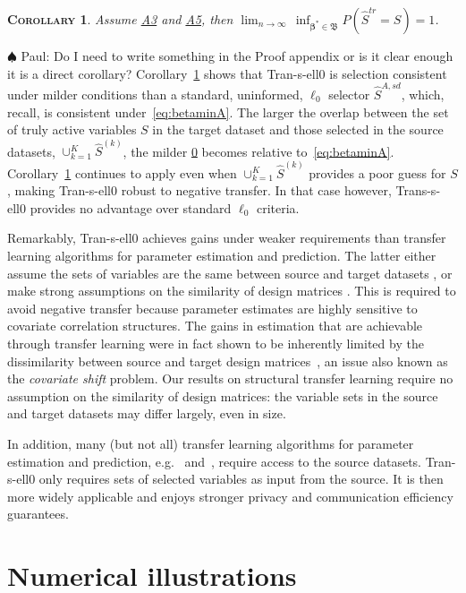 \documentclass[
  12pt]{article}
\newcommand{\paul}[1]{{\small{\color{green} \sf $\spadesuit$ Paul: #1}}}
\newcommand{\bbeta}{\boldsymbol{\beta}}
\newtheorem{cor}[thm]{\textsc{Corollary}}
\begin{document}
\begin{cor}\label{cor:TLconsist}
    Assume \hyperlink{lab:A3}{A3} and \hyperlink{lab:A5}{A5}, then $\lim_{n \to \infty} \,\inf_{\bbeta^*\in\mathfrak{B}}P(\hat{S}^{tr} = S) = 1$.
\end{cor}
\paul{Do I need to write something in the Proof appendix or is it clear enough it is a direct corollary?}
Corollary~\ref{cor:TLconsist} shows that Tran-s-ell0 is selection consistent under milder conditions than a standard, uninformed, $\ell_0$ selector $\hat S^{A,sd}$, which, recall, is consistent under~\eqref{eq:betaminA}. The larger the overlap between the set of truly active variables $S$ in the target dataset and those selected in the source datasets, $\cup_{k=1}^K\hat S^{(k)}$,
the milder \hyperlink{lab:A5}{0} becomes relative to~\eqref{eq:betaminA}.
Corollary~\ref{cor:TLconsist} continues to apply even when $\cup_{k=1}^K\hat S^{(k)}$ provides a poor guess for $S$, making Tran-s-ell0 robust to negative transfer. In that case however, Trans-s-ell0 provides no advantage over standard $\ell_0$ criteria.

Remarkably, Tran-s-ell0 achieves gains under weaker requirements than transfer learning algorithms for parameter estimation and prediction. The latter either assume the sets of variables are the same between source and target datasets \citep{abba2024}, or make strong assumptions on the similarity of design matrices \citep{Li2021,Tian2023}. This is required to avoid negative transfer because parameter estimates are highly sensitive to covariate correlation structures. The gains in estimation that are achievable through transfer learning were in fact shown to be inherently limited by the dissimilarity between source and target design matrices~\citep{liu2025}, an issue also known as the \textit{covariate shift} problem. Our results on structural transfer learning require no assumption on the similarity of design matrices: the variable sets in the source and target datasets may differ largely, even in size.

In addition, many (but not all) transfer learning algorithms for parameter estimation and prediction, e.g.~\cite{Jiang2016} and~\cite{Li2021}, require access to the source datasets. Tran-s-ell0 only requires sets of selected variables as input from the source. It is then more widely applicable and enjoys stronger privacy and communication efficiency guarantees. 

\section{Numerical illustrations}\label{sec:examplesinforml0}
\end{document}
